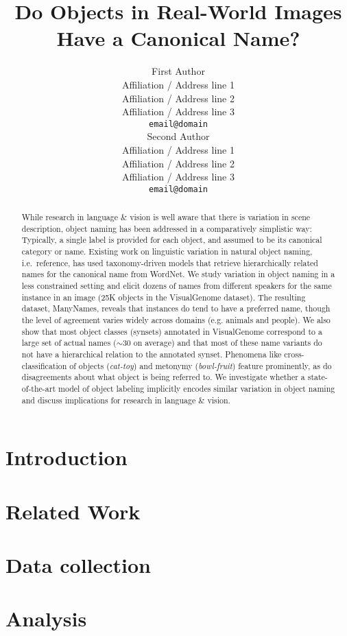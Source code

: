 \documentclass[11pt,a4paper]{article}
\title{Do Objects in Real-World Images Have a Canonical Name?}
\author{First Author \\
	Affiliation / Address line 1 \\
	Affiliation / Address line 2 \\
	Affiliation / Address line 3 \\
	{\tt email@domain} \\\And
	Second Author \\
	Affiliation / Address line 1 \\
	Affiliation / Address line 2 \\
	Affiliation / Address line 3 \\
	{\tt email@domain} \\}
\date{}
\begin{document}
\maketitle

\begin{abstract}
While research in language \& vision is well aware that there is variation in scene description, object naming has been addressed in a comparatively simplistic way: 
Typically, a single label is provided for each object, and assumed to be its canonical category or name.
Existing work on linguistic variation in natural object naming, i.e.\ reference, has used taxonomy-driven models that retrieve hierarchically related names for the canonical name from WordNet. 
We study variation in object naming in a less constrained setting and elicit dozens of names from different speakers for the same instance in an image (25K objects in the VisualGenome dataset).
The resulting dataset, ManyNames, reveals that instances do tend to have a preferred name, though the level of agreement varies widely across domains (e.g. animals and people).
 We also show that most object classes (synsets) annotated in VisualGenome correspond to a large set of actual names ($\sim$30 on average) and that most of these name variants do not have a hierarchical relation to the annotated synset.
 Phenomena like cross-classification of objects (\textit{cat-toy}) and metonymy (\textit{bowl-fruit}) feature prominently, as do disagreements about what object is being referred to.
 We investigate whether a state-of-the-art model of object labeling implicitly encodes similar variation in object naming and discuss implications for research in language \& vision.
\end{abstract}

\section{Introduction}


\section{Related Work}
\label{sec:relwork}


\section{Data collection}
\label{sec:data}


\section{Analysis}
\label{sec:analysis}

\end{document}
